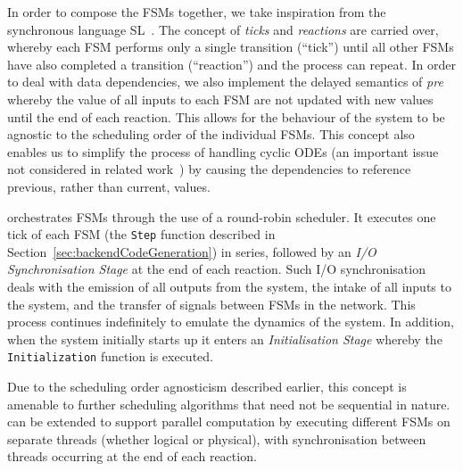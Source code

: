 In order to compose the \acp{FSM} together, we take inspiration
from the synchronous language SL~\cite{SlLanguage}.  The 
concept of \emph{ticks} and \emph{reactions} are carried over, whereby each 
\ac{FSM} performs 
only a single transition (``tick'') until all other \acp{FSM} have also 
completed a transition (``reaction'') and the process can repeat.  In order to
deal with data dependencies, we also implement the delayed semantics of 
\emph{pre}
whereby the value of all inputs to each \ac{FSM} are not updated with
new values until the end of each reaction.  This allows for the behaviour of 
the system to be agnostic to the scheduling order of the individual 
\acp{FSM}.  This concept also enables us to simplify the process of 
handling cyclic \acp{ODE} (an important issue not considered in related 
work~\cite{kim2003modular}) by causing the dependencies to reference
previous, rather than current, values.

\ourTool orchestrates \acp{FSM} through the use of a round-robin
scheduler.  It executes one tick of each \ac{FSM} (the \texttt{Step} function 
described in Section~\ref{sec:backendCodeGeneration}) in series, followed by an 
\emph{I/O Synchronisation Stage} at the end of each reaction.  Such I/O 
synchronisation deals with the emission of all outputs from the system, the 
intake of all inputs to the system, and the transfer of signals between 
\acp{FSM} in the network.  This process continues indefinitely to emulate the 
dynamics of the system.  In addition, when the system initially starts up it 
enters an \emph{Initialisation Stage} whereby the \texttt{Initialization} 
function is executed.

Due to the scheduling order agnosticism described earlier, this concept is 
amenable to further scheduling algorithms that need not be sequential in 
nature.  \ourTool can be extended to support parallel computation by executing 
different \acp{FSM} on separate threads (whether logical or physical), with 
synchronisation between threads occurring at the end of each reaction.
